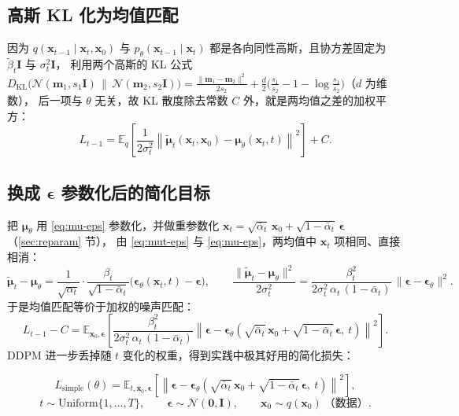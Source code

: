 \documentclass[a4paper,fontset=none,zihao=5]{ctexart}
\numberwithin{equation}{section}
\newcommand{\x}{\mathbf{x}}
\newcommand{\I}{\mathbf{I}}
\newcommand{\N}{\mathcal{N}}
\newcommand{\abar}{\bar{\alpha}}
\newcommand{\eps}{\boldsymbol{\epsilon}}
\newcommand{\epst}{\boldsymbol{\epsilon}_\theta}
\newcommand{\mut}{\tilde{\boldsymbol{\mu}}}
\newcommand{\mutheta}{\boldsymbol{\mu}_\theta}
\newcommand{\btil}{\tilde{\beta}}
\newcommand{\E}{\mathbb{E}}
\newcommand{\Lsimple}{L_{\mathrm{simple}}}
\begin{document}
\subsection{高斯 KL 化为均值匹配}
因为 $q(\x_{t-1}\mid\x_t,\x_0)$ 与 $p_\theta(\x_{t-1}\mid\x_t)$ 都是各向同性高斯，且协方差固定为 $\btil_t\I$ 与 $\sigma_t^2\I$，
利用两个高斯的 KL 公式 $D_{\mathrm{KL}}\big(\N(\mathbf{m}_1,s_1\I)\,\|\,\N(\mathbf{m}_2,s_2\I)\big)=\frac{\|\mathbf{m}_1-\mathbf{m}_2\|^2}{2s_2}+\frac d2\big(\frac{s_1}{s_2}-1-\log\frac{s_1}{s_2}\big)$（$d$ 为维数），
后一项与 $\theta$ 无关，故 KL 散度除去常数 $C$ 外，就是两均值之差的加权平方：
\begin{equation}
  L_{t-1} = \E_q\!\left[\frac{1}{2\sigma_t^2}\left\|\mut_t(\x_t,\x_0)-\mutheta(\x_t,t)\right\|^2\right] + C .
  \label{eq:mean-match}
\end{equation}

\subsection{换成 \texorpdfstring{$\eps$}{eps} 参数化后的简化目标}
把 $\mutheta$ 用 \eqref{eq:mu-eps} 参数化，并做重参数化 $\x_t=\sqrt{\abar_t}\,\x_0+\sqrt{1-\abar_t}\,\eps$（\ref{sec:reparam} 节），
由 \eqref{eq:mut-eps} 与 \eqref{eq:mu-eps}，两均值中 $\x_t$ 项相同、直接相消：
\begin{equation}
  \mut_t-\mutheta=\frac{1}{\sqrt{\alpha_t}}\cdot\frac{\beta_t}{\sqrt{1-\abar_t}}\big(\epst(\x_t,t)-\eps\big),
  \qquad
  \frac{\|\mut_t-\mutheta\|^2}{2\sigma_t^2}=\frac{\beta_t^2}{2\sigma_t^2\,\alpha_t\,(1-\abar_t)}\,\|\eps-\epst\|^2 .
\end{equation}
于是均值匹配等价于加权的噪声匹配：
\begin{equation}
  L_{t-1} - C = \E_{\x_0,\eps}\!\left[\frac{\beta_t^2}{2\sigma_t^2\,\alpha_t\,(1-\abar_t)}
     \left\|\eps-\epst\!\left(\sqrt{\abar_t}\,\x_0+\sqrt{1-\abar_t}\,\eps,\ t\right)\right\|^2\right].
  \label{eq:weighted}
\end{equation}
DDPM 进一步丢掉随 $t$ 变化的权重，得到实践中极其好用的简化损失：
\begin{keybox}
\begin{equation}
  \Lsimple(\theta) = \E_{t,\x_0,\eps}\!\left[\left\|\eps-\epst\!\left(\sqrt{\abar_t}\,\x_0+\sqrt{1-\abar_t}\,\eps,\ t\right)\right\|^2\right],
  \label{eq:lsimple}
\end{equation}
\[
  t\sim\mathrm{Uniform}\{1,\dots,T\},\qquad \eps\sim\N(\mathbf{0},\I),\qquad \x_0\sim q(\x_0)\ \text{（数据）}.
\]
\end{keybox}
\end{document}

